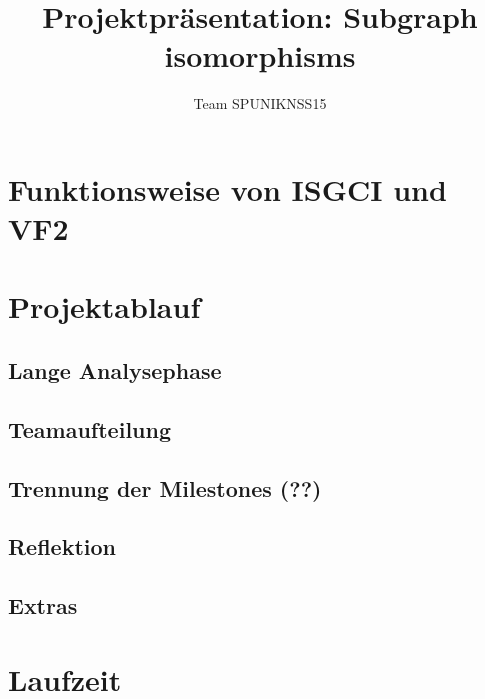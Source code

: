 \documentclass[t]{beamer}
\title{Projektpräsentation: Subgraph isomorphisms}
\author{Team SPUNIKNSS15}
\date{}
\begin{document}
  
  \frame{
    \tableofcontents
  }
  \section{Funktionsweise von ISGCI und VF2}
  
  
  \section{Projektablauf}
    
    \subsection{Lange Analysephase}
    
    \subsection{Teamaufteilung}
    
    \subsection{Trennung der Milestones (??)}
    
    \subsection{Reflektion}
    
    \subsection{Extras}
    
  \section{Laufzeit}
  
\end{document}
